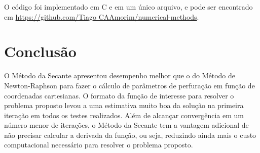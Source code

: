 \documentclass[final,5p]{elsarticle}
\numberwithin{equation}{section}
\begin{document}
        O código foi implementado em C e em um único arquivo, e pode ser encontrado em \href{https://github.com/TiagoCAAmorim/numerical-methods/blob/main/04_Splines/04_splines.c}{https://github.com/Tiago CAAmorim/numerical-methods}.

    \section{Conclusão}
    
        O Método da Secante apresentou desempenho melhor que o do Método de Newton-Raphson para fazer o cálculo de parâmetros de perfuração em função de coordenadas cartesianas. O formato da função de interesse para resolver o problema proposto levou a uma estimativa muito boa da solução na primeira iteração em todos os testes realizados. Além de alcançar convergência em um número menor de iterações, o Método da Secante tem a vantagem adicional de não precisar calcular a derivada da função, ou seja, reduzindo ainda mais o custo computacional necessário para resolver o problema proposto.

    

\appendix




 







\end{document}
